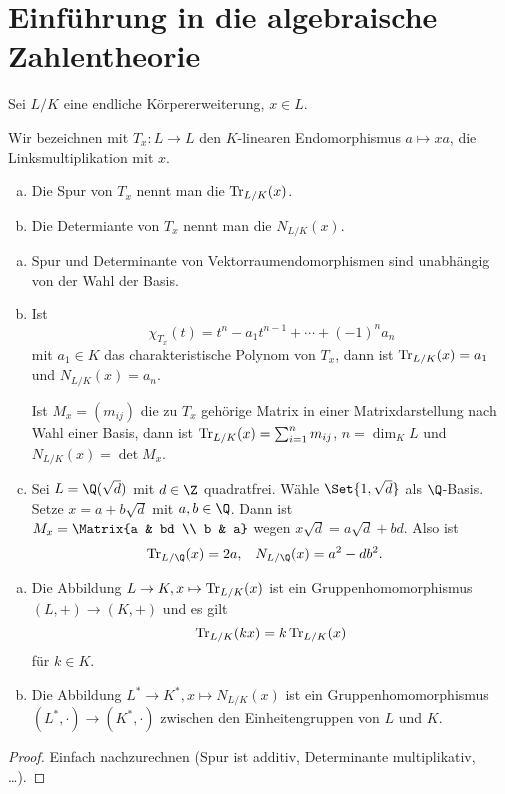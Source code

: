 \chapter{Einführung in die algebraische Zahlentheorie}


\begin{df} \label{8.1}
	Sei $L / K$ eine endliche Körpererweiterung, $x \in L$.

	Wir bezeichnen mit $T_x: L \to L$ den $K$-linearen Endomorphismus $a \mapsto x a$, die Linksmultiplikation mit $x$.
	\begin{enumerate}[a)]
		\item
			Die Spur von $T_x$ nennt man die  $\operatorname{Tr}_{L/K}(x)$.
		\item
			Die Determiante von $T_x$ nennt man die  $N_{L/K}(x)$.
	\end{enumerate}
\end{df}

\begin{nt} \label{8.2}
	\begin{enumerate}[a)]
		\item
			Spur und Determinante von Vektorraumendomorphismen sind unabhängig von der Wahl der Basis.
		\item
			Ist
			\[
				\chi_{T_x}(t)
				= t^n - a_1 t^{n-1} + \dotsb + (-1)^n a_n
			\]
			mit $a_1 \in K$ das charakteristische Polynom von $T_x$, dann ist $\operatorname{Tr}_{L/K}(x) = a_1$ und $N_{L/K}(x) = a_n$.

			Ist $M_x = (m_{ij})$ die zu $T_x$ gehörige Matrix in einer Matrixdarstellung nach Wahl einer Basis, dann ist $\operatorname{Tr}_{L/K}(x) = \sum_{i=1}^n m_{ij}$, $n = \dim_K L$ und $N_{L/K}(x) = \det M_x$.
		\item
			Sei $L = \Q(\sqrt d)$ mit $d \in \Z$ quadratfrei.
			Wähle $\Set{1, \sqrt d}$ als $\Q$-Basis.
			Setze $x = a + b \sqrt d$ mit $a, b \in \Q$.
			Dann ist $M_x = \Matrix{a & bd \\ b & a}$ wegen $x \sqrt d = a \sqrt d + b d$.
			Also ist
			\begin{align*}
				\Tr_{L/\Q}(x) &= 2a, &
				N_{L/\Q}(x) &= a^2 - db^2.
			\end{align*}
	\end{enumerate}
\end{nt}

\begin{lem} \label{8.3}
	\begin{enumerate}[a)]
		\item
			Die Abbildung $L \to K, x \mapsto \operatorname{Tr}_{L/K}(x)$ ist ein Gruppenhomomorphismus $(L, +) \to (K, +)$ und es gilt
			\[
				\operatorname{Tr}_{L/K}(kx) = k \operatorname{Tr}_{L/K}(x)
			\]
			für $k \in K$.
		\item
			Die Abbildung $L^* \to K^*, x \mapsto N_{L/K}(x)$ ist ein Gruppenhomomorphismus $(L^*, \cdot) \to (K^*, \cdot)$ zwischen den Einheitengruppen von $L$ und $K$.
	\end{enumerate}
	\begin{proof}
		Einfach nachzurechnen (Spur ist additiv, Determinante multiplikativ, \dots).
	\end{proof}
\end{lem}

